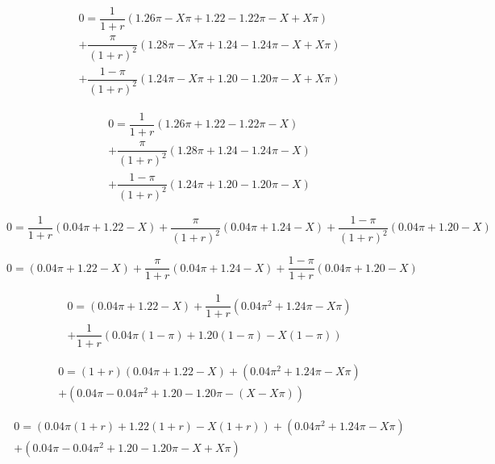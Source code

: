 \documentclass{article}
\begin{document}
\begin{multline*}
    0=\dfrac{1}{1+r}\left(1.26\pi-X\pi+1.22-1.22\pi-X+X\pi\right)\\
    +\dfrac{\pi}{\left(1+r\right)^{2}}\left(1.28\pi-X\pi+1.24-1.24\pi-X+X\pi\right)\\
    +\dfrac{1-\pi}{\left(1+r\right)^{2}}\left(1.24\pi-X\pi+1.20-1.20\pi-X+X\pi\right)
\end{multline*}

\begin{multline*}
    0=\dfrac{1}{1+r}\left(1.26\pi+1.22-1.22\pi-X\right)\\
    +\dfrac{\pi}{\left(1+r\right)^{2}}\left(1.28\pi+1.24-1.24\pi-X\right)\\
    +\dfrac{1-\pi}{\left(1+r\right)^{2}}\left(1.24\pi+1.20-1.20\pi-X\right)
\end{multline*}

\begin{equation*}
    0=\dfrac{1}{1+r}\left(0.04\pi+1.22-X\right)+\dfrac{\pi}{\left(1+r\right)^{2}}\left(0.04\pi+1.24-X\right)+\dfrac{1-\pi}{\left(1+r\right)^{2}}\left(0.04\pi+1.20-X\right)
\end{equation*}

\begin{equation*}
    0=\left(0.04\pi+1.22-X\right)+\dfrac{\pi}{1+r}\left(0.04\pi+1.24-X\right)+\dfrac{1-\pi}{1+r}\left(0.04\pi+1.20-X\right)
\end{equation*}

\begin{multline*}
    0=\left(0.04\pi+1.22-X\right)+\dfrac{1}{1+r}\left(0.04\pi^{2}+1.24\pi-X\pi\right)\\
    +\dfrac{1}{1+r}\left(0.04\pi\left(1-\pi\right)+1.20\left(1-\pi\right)-X\left(1-\pi\right)\right)
\end{multline*}

\begin{multline*}
    0=\left(1+r\right)\left(0.04\pi+1.22-X\right)+\left(0.04\pi^{2}+1.24\pi-X\pi\right)\\
    +\left(0.04\pi-0.04\pi^{2}+1.20-1.20\pi-\left(X-X\pi\right)\right)
\end{multline*}

\begin{multline*}
    0=\left(0.04\pi\left(1+r\right)+1.22\left(1+r\right)-X\left(1+r\right)\right)+\left(0.04\pi^{2}+1.24\pi-X\pi\right)\\
    +\left(0.04\pi-0.04\pi^{2}+1.20-1.20\pi-X+X\pi\right)
\end{multline*}
\end{document}
